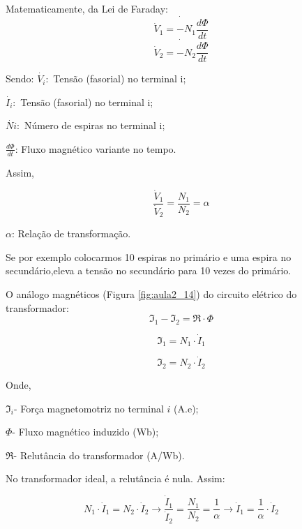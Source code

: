 Matematicamente, da Lei de Faraday:
\begin{equation}\label{eq:lf}
\dot{\dot{V}_{1}=-N_{1}\frac{d\Phi}{dt}}
\end{equation}
\begin{equation}\label{eq:lf2}
\dot{\dot{V}_{2}=-N_{2}\frac{d\Phi}{dt}}
\end{equation}


Sendo:
$\dot{V_{i}}:$ Tensão (fasorial) no terminal i;

$\dot{I_{i}}:$ Tensão (fasorial) no terminal i;

$\dot{Ni}:$ Número de espiras no terminal i;

$\frac{d\Phi}{dt}$: Fluxo magnético variante no tempo.

Assim,

\begin{equation}\label{eq:lf2}
\frac{\dot{V}_{1}}{\dot{V}_{2}}=\frac{N_{1}}{N_{2}}=\alpha
\end{equation}

$\alpha$: Relação de transformação.

Se por exemplo colocarmos 10 espiras no primário e uma espira no secundário,eleva
a tensão no secundário para 10 vezes do primário. 

O análogo magnéticos (Figura \ref{fig:aula2_14}) do circuito elétrico do transformador:
\begin{equation}\label{eq:cet1}
\Im_{1}-\Im_{2}=\Re\cdot\Phi
\end{equation}

\begin{equation}\label{eq:cet2}
\Im_{1}=N_{1}\cdot\dot{I}_{1}
\end{equation}

\begin{equation}\label{eq:cet3}
\Im_{2}=N_{2}\cdot\dot{I}_{2}
\end{equation}


Onde, 

$\Im_{i}$- Força magnetomotriz no terminal $i$ (A.e);

$\Phi$- Fluxo magnético induzido (Wb);

$\Re$- Relutância do transformador (A/Wb).

No transformador ideal, a relutância é nula. Assim:

\begin{equation}\label{eq:cet4}
N_{1}\cdot\dot{I}_{1}=N_{2}\cdot\dot{I}_{2}\rightarrow\frac{\dot{I}_{1}}{\dot{I}_{2}}=\frac{N_{1}}{N_{2}}=\frac{1}{\alpha}\rightarrow\dot{I}_{1}=\frac{1}{\alpha}\cdot\dot{I}_{2}
\end{equation}


